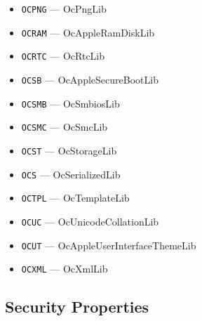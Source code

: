\documentclass[]{article}
\begin{document}
\begin{enumerate}
\begin{itemize}
  \item \texttt{OCPNG} --- OcPngLib
  \item \texttt{OCRAM} --- OcAppleRamDiskLib
  \item \texttt{OCRTC} --- OcRtcLib
  \item \texttt{OCSB} --- OcAppleSecureBootLib
  \item \texttt{OCSMB} --- OcSmbiosLib
  \item \texttt{OCSMC} --- OcSmcLib
  \item \texttt{OCST} --- OcStorageLib
  \item \texttt{OCS} --- OcSerializedLib
  \item \texttt{OCTPL} --- OcTemplateLib
  \item \texttt{OCUC} --- OcUnicodeCollationLib
  \item \texttt{OCUT} --- OcAppleUserInterfaceThemeLib
  \item \texttt{OCXML} --- OcXmlLib
  \end{itemize}

\end{enumerate}

\subsection{Security Properties}\label{miscsecurityprops}
\end{document}
